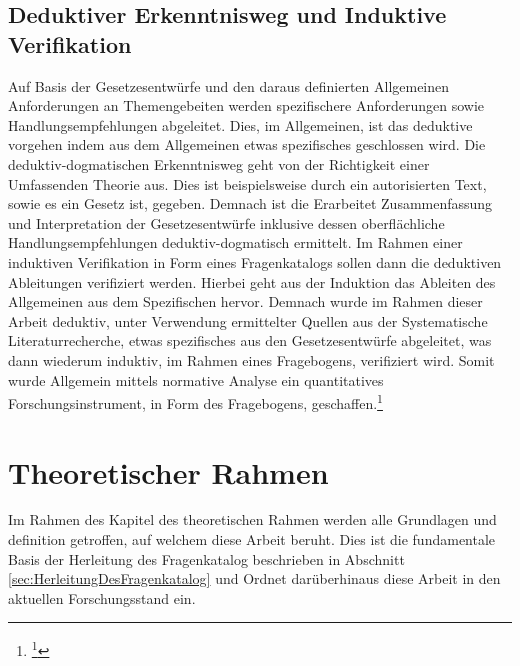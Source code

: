 \documentclass[11pt,a4paper,hidelinks]{article}   %
\begin{document}
        \subsection{Deduktiver Erkenntnisweg und Induktive Verifikation}
            Auf Basis der Gesetzesentwürfe und den daraus definierten Allgemeinen Anforderungen an Themengebeiten werden spezifischere Anforderungen sowie Handlungsempfehlungen abgeleitet. Dies, im Allgemeinen, ist das deduktive vorgehen indem aus dem Allgemeinen etwas spezifisches geschlossen wird. Die deduktiv-dogmatischen Erkenntnisweg geht von der Richtigkeit einer Umfassenden Theorie aus. Dies ist beispielsweise durch ein autorisierten Text, sowie es ein Gesetz ist, gegeben. Demnach ist die Erarbeitet Zusammenfassung und Interpretation der Gesetzesentwürfe inklusive dessen oberflächliche Handlungsempfehlungen deduktiv-dogmatisch ermittelt. Im Rahmen einer induktiven Verifikation in Form eines Fragenkatalogs sollen dann die deduktiven Ableitungen verifiziert werden. Hierbei geht aus der Induktion das Ableiten des Allgemeinen aus dem Spezifischen hervor. Demnach wurde im Rahmen dieser Arbeit deduktiv, unter Verwendung ermittelter Quellen aus der Systematische Literaturrecherche, etwas spezifisches aus den Gesetzesentwürfe abgeleitet, was dann wiederum induktiv, im Rahmen eines Fragebogens, verifiziert wird. Somit wurde Allgemein mittels normative Analyse ein quantitatives Forschungsinstrument, in Form des Fragebogens, geschaffen.\footnote{
                \footcite[Vgl. S. 32 - 33, 36][]{3170154869}
            }
    
    \newpage
    \section{Theoretischer Rahmen}
        Im Rahmen des Kapitel des theoretischen Rahmen werden alle Grundlagen und definition getroffen, auf welchem diese Arbeit beruht. Dies ist die fundamentale Basis der Herleitung des Fragenkatalog beschrieben in Abschnitt \ref{sec:HerleitungDesFragenkatalog} und Ordnet darüberhinaus diese Arbeit in den aktuellen Forschungsstand ein.
\end{document}
